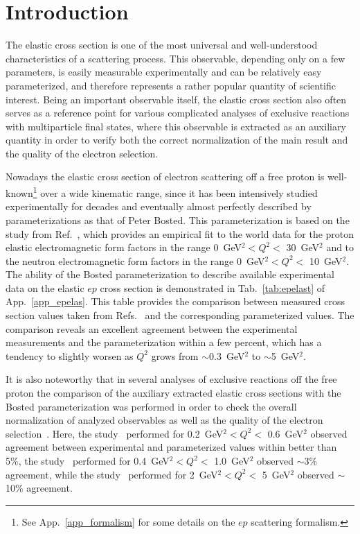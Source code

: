 

\newpage
\chapter{Introduction}
\mbox{}\vspace{-\baselineskip}



The elastic cross section is one of the most universal and well-understood characteristics of a scattering process. This observable, depending only on a few parameters, is easily measurable experimentally and can be relatively easy parameterized, and therefore represents a rather popular quantity of scientific interest. Being an important observable itself, the elastic cross section also often serves as a reference point for various complicated analyses of exclusive reactions with multiparticle final states, where this observable is extracted as an auxiliary quantity in order to verify both the correct normalization of the main result and the quality of the electron selection.

Nowadays the elastic cross section of electron scattering off a free proton is well-known\footnote[1]{See App.~\ref{app_formalism} for some details on the $ep$ scattering formalism.} over a wide kinematic range, since it has been intensively studied experimentally for decades and eventually almost perfectly described by parameterizations as that of Peter Bosted. This parameterization is based on the study from Ref.~\cite{Bosted:1994tm}, which provides an empirical fit to the world data for the proton elastic electromagnetic form factors in the range 0~GeV$^2<Q^2<$ 30~GeV$^2$ and to the neutron electromagnetic form factors in the range 0~GeV$^2<Q^2<$ 10~GeV$^2$. The ability of the Bosted parameterization to describe available experimental data on the elastic $ep$ cross section is demonstrated in Tab.~\ref{tab:epelast} of App.~\ref{app_epelas}. This table provides the comparison between measured cross section values taken from Refs.~\cite{Goitein:1970pz,Sill:1992qw,Christy:2004rc} and the corresponding parameterized values. The comparison reveals an excellent agreement between the experimental measurements and the parameterization within a few percent, which has a tendency to slightly worsen as $Q^{2}$ grows from $\sim$0.3~GeV$^{2}$ to $\sim$5~GeV$^{2}$.

It is also noteworthy that in several analyses of exclusive reactions off the free proton the comparison of the auxiliary extracted elastic cross sections with the Bosted parameterization was performed in order to check the overall normalization of analyzed observables as well as the quality of the electron selection~\cite{Fed_an_note:2007,Fedotov:2008aa,Fed_an_note:2017,Fedotov:2018oan,Isupov_note,Isupov:2017lnd}. Here, the study~\cite{Fed_an_note:2007,Fedotov:2008aa} performed for 0.2~GeV$^2<Q^{2}<$ 0.6~GeV$^2$ observed agreement between experimental and parameterized values within better than 5\%, the study~\cite{Fed_an_note:2017, Fedotov:2018oan} performed for 0.4~GeV$^2<Q^{2}<$ 1.0~GeV$^2$ observed $\sim$3\% agreement, while the study~\cite{Isupov_note,Isupov:2017lnd} performed for 2~GeV$^2<Q^{2}<$ 5~GeV$^2$ observed $\sim$10\% agreement.


